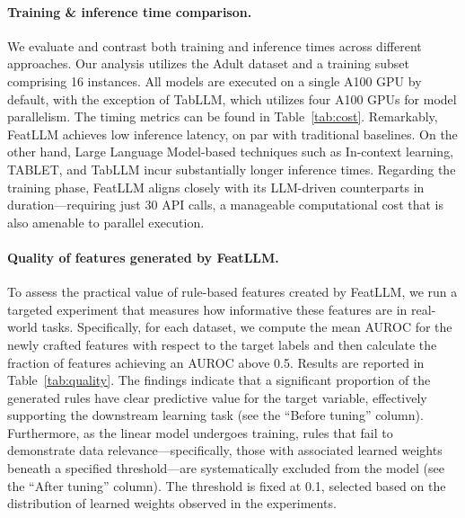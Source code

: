 \vspace*{-0.12in}
\paragraph{Training \& inference time comparison.} We evaluate and contrast both training and inference times across different approaches. Our analysis utilizes the Adult dataset and a training subset comprising 16 instances. All models are executed on a single A100 GPU by default, with the exception of TabLLM, which utilizes four A100 GPUs for model parallelism. The timing metrics can be found in Table~\ref{tab:cost}. Remarkably, \textsf{FeatLLM} achieves low inference latency, on par with traditional baselines. On the other hand, Large Language Model-based techniques such as In-context learning, TABLET, and TabLLM incur substantially longer inference times. Regarding the training phase, \textsf{FeatLLM} aligns closely with its LLM-driven counterparts in duration—requiring just 30 API calls, a manageable computational cost that is also amenable to parallel execution.

\vspace*{-0.12in}
\paragraph{Quality of features generated by \textsf{FeatLLM}.}
To assess the practical value of rule-based features created by \textsf{FeatLLM}, we run a targeted experiment that measures how informative these features are in real-world tasks. Specifically, for each dataset, we compute the mean AUROC for the newly crafted features with respect to the target labels and then calculate the fraction of features achieving an AUROC above 0.5. Results are reported in Table~\ref{tab:quality}. The findings indicate that a significant proportion of the generated rules have clear predictive value for the target variable, effectively supporting the downstream learning task (see the “Before tuning” column). Furthermore, as the linear model undergoes training, rules that fail to demonstrate data relevance—specifically, those with associated learned weights beneath a specified threshold—are systematically excluded from the model (see the “After tuning” column). The threshold is fixed at 0.1, selected based on the distribution of learned weights observed in the experiments.

\vspace*{-0.12in}

